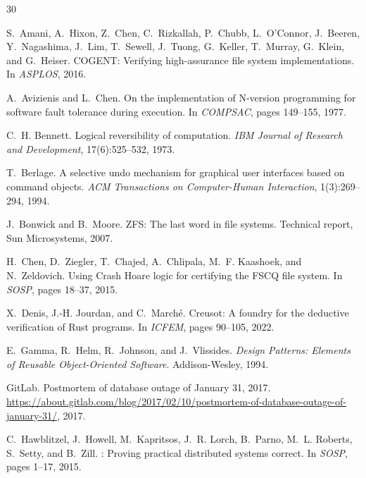 \documentclass[11pt,a4paper]{article}
\begin{document}
\begin{thebibliography}{30}

S.~Amani, A.~Hixon, Z.~Chen, C.~Rizkallah, P.~Chubb, L.~O'Connor,
  J.~Beeren, Y.~Nagashima, J.~Lim, T.~Sewell, J.~Tuong, G.~Keller, T.~Murray,
  G.~Klein, and G.~Heiser.
\newblock COGENT: Verifying high-assurance file system implementations.
\newblock In \emph{ASPLOS}, 2016.

A.~Avizienis and L.~Chen.
\newblock On the implementation of N-version programming for software fault
  tolerance during execution.
\newblock In \emph{COMPSAC}, pages 149--155, 1977.

C.~H. Bennett.
\newblock Logical reversibility of computation.
\newblock \emph{IBM Journal of Research and Development}, 17(6):525--532, 1973.

T.~Berlage.
\newblock A selective undo mechanism for graphical user interfaces based on
  command objects.
\newblock \emph{ACM Transactions on Computer-Human Interaction}, 1(3):269--294,
  1994.

J.~Bonwick and B.~Moore.
\newblock ZFS: The last word in file systems.
\newblock Technical report, Sun Microsystems, 2007.

H.~Chen, D.~Ziegler, T.~Chajed, A.~Chlipala, M.~F. Kaashoek, and
  N.~Zeldovich.
\newblock Using {Crash Hoare} logic for certifying the {FSCQ} file system.
\newblock In \emph{SOSP}, pages 18--37, 2015.

X.~Denis, J.-H. Jourdan, and C.~March\'e.
\newblock Creusot: A foundry for the deductive verification of {Rust} programs.
\newblock In \emph{ICFEM}, pages 90--105, 2022.

E.~Gamma, R.~Helm, R.~Johnson, and J.~Vlissides.
\newblock \emph{Design Patterns: Elements of Reusable Object-Oriented Software}.
\newblock Addison-Wesley, 1994.

GitLab.
\newblock Postmortem of database outage of {January 31, 2017}.
\newblock \url{https://about.gitlab.com/blog/2017/02/10/postmortem-of-database-outage-of-january-31/},
  2017.

C.~Hawblitzel, J.~Howell, M.~Kapritsos, J.~R. Lorch, B.~Parno, M.~L.
  Roberts, S.~Setty, and B.~Zill.
: Proving practical distributed systems correct.
\newblock In \emph{SOSP}, pages 1--17, 2015.


\end{thebibliography}
\end{document}

